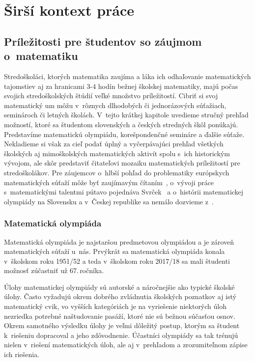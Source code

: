 \cleardoublepage

\renewcommand{\chaptermark}[1]{\markboth{\thechapter. #1}{}}
\renewcommand{\sectionmark}[1]{\markright{\thesection. #1}{}}
\HlavickaKapitoly
\chapter{Širší kontext práce}
\section{Príležitosti pre študentov so záujmom o~matematiku}

Stredoškoláci, ktorých matematika zaujíma a láka ich odhaľovanie matematických tajomstiev aj za hranicami 3-4 hodín bežnej školskej matematiky, majú počas svojich stredoškolských štúdií veľké množstvo príležitostí. Cibriť si svoj matematický um môžu v~rôznych dlhodobých či jednorázových súťažiach, seminároch či letných školách. V~tejto krátkej kapitole uvedieme stručný prehľad možností, ktoré sa študentom slovenských a českých stredných škôl ponúkajú. Predstavíme matematickú olympiádu, korešpondenčné semináre a ďalšie súťaže. Nekladieme si však za cieľ podať úplný a vyčerpávajúci prehľad všetkých školských aj mimoškolských matematických aktivít spolu s~ich historickým vývojom, ale skôr predstaviť čitateľovi mozaiku matematických príležitostí pre stredoškolákov. Pre záujemcov o~hlbší pohľad do problematiky európskych matematických súťaží môže byť zaujímavým čítaním~\cite{huv},  o~vývoji práce s~matematickými talentmi pútavo pojednáva Svrček~\cite{svrcek2014} a o~histórii matematickej olympiády na Slovensku a v~Českej republike sa nemálo dozvieme z~\cite{dos}.


\subsection*{Matematická olympiáda}

Matematická olympiáda je najstaršou predmetovou olympiádou a je zároveň  matematických súťaží u~nás. Prvýkrát sa matematická olympiáda konala v~školskom roku 1951/52 a teda v~školskom roku 2017/18 sa mali študenti možnosť zúčastniť už 67.\,ročníka.

Úlohy matematickej olympiády sú autorské a náročnejšie ako typické školské úlohy. Často vyžadujú okrem dobrého zvládnutia školských poznatkov aj istý matematický cvik, vo vyšších kategóriách je na vyriešenie niektorých úloh nezriedka potrebné naštudovanie pasáží, ktoré nie sú bežnou súčasťou osnov. Okrem samotného výsledku úlohy je veľmi dôležitý postup, ktorým sa študent k~riešeniu dopracoval a jeho zdôvodnenie. Účastníci olympiády sa tak trénujú nielen v~riešení matematických úloh, ale aj v~prehľadom a zrozumiteľnom zápise ich riešenia.


